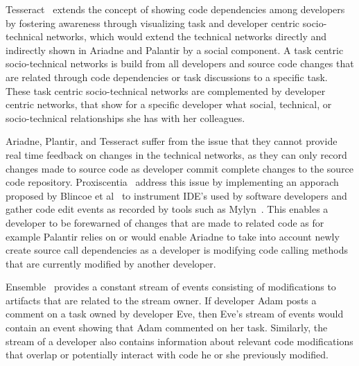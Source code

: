 Tesseract~\cite{sarma:icse:2009} extends the concept of showing code dependencies among developers by fostering awareness through visualizing task and developer centric socio-technical networks, which would extend the technical networks directly and indirectly shown in Ariadne and Palantir by a social component.
A task centric socio-technical networks is build from all developers and source code changes that are related through code dependencies or task discussions to a specific task.
These task centric socio-technical networks are complemented by developer centric networks, that show for a specific developer what social, technical, or socio-technical relationships she has with her colleagues.

Ariadne, Plantir, and Tesseract suffer from the issue that they cannot provide real time feedback on changes in the technical networks, as they can only record changes made to source code as developer commit complete changes to the source code repository. 
Proxiscentia~\cite{borici:chase:2012} address this issue by implementing an apporach proposed by Blincoe et al~\cite{blincoe:cscw:2012} to instrument IDE's used by software developers and gather code edit events as recorded by tools such as Mylyn~\cite{kersten:aosd:2005}.
This enables a developer to be forewarned of changes that are made to related code as for example Palantir relies on or would enable Ariadne to take into account newly create source call dependencies as a developer is modifying code calling methods that are currently modified by another developer.

Ensemble~\cite{xiang:rsse:2008} provides a constant stream of events consisting of modifications to artifacts that are related to the stream owner.
If developer Adam posts a comment on a task owned by developer Eve, then Eve's stream of events would contain an event showing that Adam commented on her task.
Similarly, the stream of a developer also contains information about relevant code modifications that overlap or potentially interact with code he or she previously modified.


